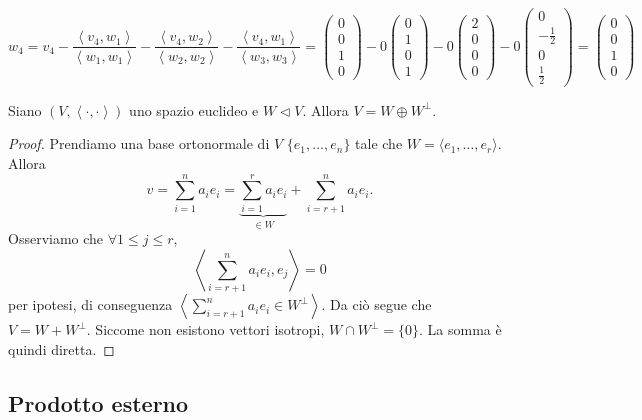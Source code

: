 \documentclass{article}     %
\newcommand{\scp}[1][\cdot,\cdot]{\left\langle #1 \right\rangle}
\let\sottosp\vartriangleleft
\begin{document}
\begin{ex}
    \[w_4=v_4-\frac{\scp[v_4,w_1]}{\scp[w_1,w_1]}-\frac{\scp[v_4,w_2]}{\scp[w_2,w_2]}-\frac{\scp[v_4,w_1]}{\scp[w_3,w_3]}= \begin{pmatrix}
        0\\0\\1\\0
    \end{pmatrix}-0\begin{pmatrix}
        0\\1\\0\\1
    \end{pmatrix}-0\begin{pmatrix}
        2\\0\\0\\0
    \end{pmatrix}-0\begin{pmatrix}
        0\\-\textstyle\frac{1}{2}\\0\\\textstyle\frac{1}{2}
    \end{pmatrix}=\begin{pmatrix}
        0\\0\\1\\0
    \end{pmatrix}\]
\end{ex}

\begin{prop}
    Siano $(V,\scp)$ uno spazio euclideo e $W\sottosp V$. Allora $V=W\oplus W^\perp$.
\end{prop}
\begin{proof}
    Prendiamo una base ortonormale di $V$ $\{e_1, \dots, e_n\}$ tale che $W=\langle e_1,\dots, e_r\rangle$. Allora 
    \[v=\sum_{i=1}^na_ie_i=\underbrace{\sum_{i=1}^ra_ie_i}_{\in W}+\sum_{i=r+1}^na_ie_i.\]
    Osserviamo che $\forall 1\leq j\leq r$, 
    \[\scp[\sum_{i=r+1}^na_ie_i, e_j]=0\]
    per ipotesi, di conseguenza $\scp[\sum_{i=r+1}^na_ie_i\in W^\perp]$. Da ciò segue che $V=W+W^\perp$. Siccome non esistono vettori isotropi, $W \cap W^\perp=\{0\}$. La somma è quindi diretta.
\end{proof}

\subsection{Prodotto esterno}
\end{document}
